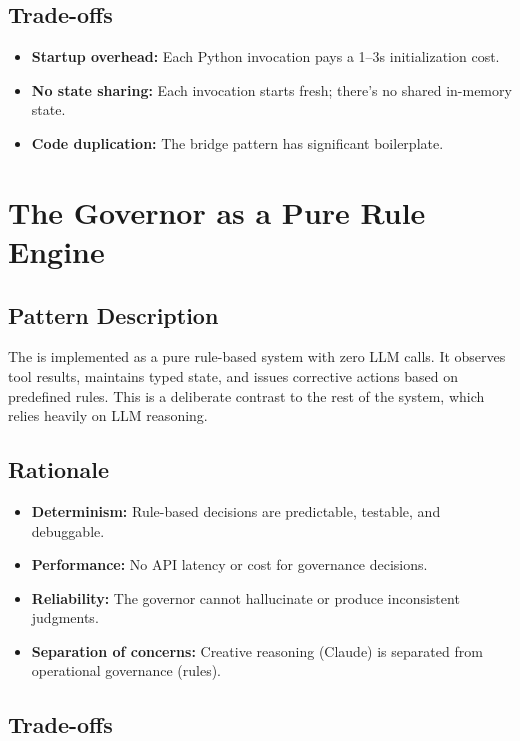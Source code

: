 \subsection{Trade-offs}

\begin{itemize}
  \item \textbf{Startup overhead:} Each Python invocation pays a 1--3s initialization cost.
  \item \textbf{No state sharing:} Each invocation starts fresh; there's no shared in-memory state.
  \item \textbf{Code duplication:} The bridge pattern has significant boilerplate.
\end{itemize}

\section{The Governor as a Pure Rule Engine}
\label{sec:patterns:governor}

\subsection{Pattern Description}

The \governor is implemented as a pure rule-based system with zero LLM calls.
It observes tool results, maintains typed state, and issues corrective actions based on predefined rules.
This is a deliberate contrast to the rest of the system, which relies heavily on LLM reasoning.

\subsection{Rationale}

\begin{itemize}
  \item \textbf{Determinism:} Rule-based decisions are predictable, testable, and debuggable.
  \item \textbf{Performance:} No API latency or cost for governance decisions.
  \item \textbf{Reliability:} The governor cannot hallucinate or produce inconsistent judgments.
  \item \textbf{Separation of concerns:} Creative reasoning (Claude) is separated from operational governance (rules).
\end{itemize}

\subsection{Trade-offs}

